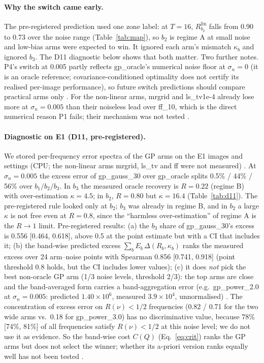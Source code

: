 \paragraph{Why the switch came early.} The pre-registered prediction used one
zone label: at $T=16$, $R^{\mathrm{lin}}_{b_2}$ falls from 0.90 to 0.73 over
the noise range (Table~\ref{tab:map}), so $b_2$ is regime A at small noise and
low-bias arms were expected to win. It ignored each arm's mismatch $\kappa_b$
and ignored $b_3$. The D11 diagnostic below shows that both matter. Two further
notes. P4's switch at 0.005 partly reflects gp\_oracle's numerical noise floor
at $\sigma_n=0$ (it is an oracle reference; covariance-conditioned optimality does not certify its realised per-image performance), so future switch predictions should compare practical
arms only . For the non-linear arms, mrgrid and ls\_tv1e-4 already
lose more at $\sigma_n=0.005$ than their noiseless lead over ff\_10, which is
the direct numerical reason P1 fails; their mechanism was not tested
.

\paragraph{Diagnostic on E1 (D11, pre-registered).} We stored per-frequency
error spectra of the GP arms on the E1 images and settings (CPU; the
non-linear arms mrgrid, ls\_tv and ff were not measured) . At
$\sigma_n=0.005$ the excess error of gp\_gauss\_30 over gp\_oracle splits
0.5\% / 44\% / 56\% over $b_1/b_2/b_3$. In $b_3$ the measured oracle
recovery is $R=0.22$ (regime B) with over-estimation $\kappa=4.5$; in $b_2$,
$R=0.80$ but $\kappa=16.4$ (Table~\ref{tab:d11}). The pre-registered rule
looked only at $b_2$; $b_3$ was already in regime B, and in $b_2$ a large
$\kappa$ is not free even at $R=0.8$, since the ``harmless over-estimation''
of regime A is the $R\to1$ limit. Pre-registered results: (a) the $b_3$ share
of gp\_gauss\_30's excess is 0.556 [0.464, 0.618], above 0.5 at the point
estimate but with a CI that includes it; (b) the band-wise predicted excess
$\sum_b E_b\,\Delta(R_b,\kappa_b)$ ranks the measured excess over 24 arm--noise
points with Spearman 0.856 [0.741, 0.918] (point threshold 0.8 holds, but the CI includes lower values); (c) it does
\emph{not} pick the best non-oracle GP arm (1/3 noise levels, threshold 2/3):
the top arms are close and the band-averaged form carries a band-aggregation error
(e.g.\ gp\_power\_2.0 at $\sigma_n=0.005$: predicted $1.40\times10^6$,
measured $3.9\times10^4$, unnormalised) . The concentration of excess
error on $R(\nu)<1/2$ frequencies (0.82 / 0.71 for the two wide arms vs.\ 0.18
for gp\_power\_3.0) has no discriminative value, because 78\% [74\%, 81\%] of
all frequencies satisfy $R(\nu)<1/2$ at this noise level; we do not use it
as evidence. So the band-wise cost $C(Q)$ (Eq.~\eqref{eq:crit}) ranks the GP arms but does
not select the winner; whether its a-priori version ranks equally well has not
been tested .

